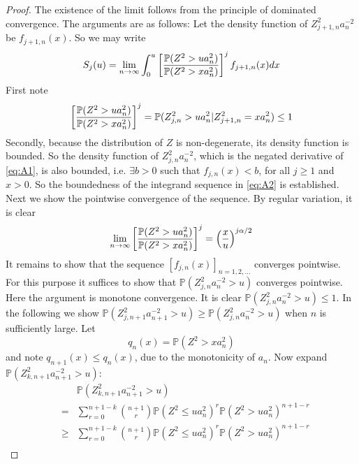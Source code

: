 \documentclass[11pt,reqno]{amsart}
\renewcommand{\P}{\mathbb{P}}
\newcommand{\1}{\mathds{1}}
\newcommand{\0}{\boldsymbol{0}}
\newcommand{\4}{\mathchoice{\mskip1.5mu}{\mskip1.5mu}{}{}}
\newcommand{\5}{\mathchoice{\mskip-1.5mu}{\mskip-1.5mu}{}{}}
\newcommand{\2}{\penalty250\mskip\thickmuskip\mskip-\thinmuskip} %
\begin{document}
\begin{proof}
The existence of the limit follows from the principle of dominated
convergence. The arguments are as follows: Let the density function of
$Z_{j+1, n}^2 a_n^{-2}$ be $f_{j+1,n}(x)$. So we may write
\begin{equation}
  \label{eq:A2}
  S_j(u) = \lim_{n \to \infty}\int_{0}^u \left[
    {\P(Z^2 > ua_n^2) \over \P(Z^2 > xa_n^2)}
  \right]^j f_{j+1,n}(x)dx
\end{equation}
First note
\[
\left[
    {\P(Z^2 > ua_n^2) \over \P(Z^2 > xa_n^2)}
  \right]^j = \P(Z_{j,n}^2 > ua_n^2 | Z_{j+1, n}^2 = xa_n^2) \leq 1
\]
Secondly, because the distribution of $Z$ is non-degenerate, its
density function is bounded. So the density function of
$Z_{j,n}^2a_n^{-2}$, which is the negated derivative of
\eqref{eq:A1}, is also bounded, i.e. $\exists b > 0$ such that
$f_{j, n}(x) < b$, for all $j \geq 1$ and $x > 0$. So the
boundedness of the integrand sequence in \eqref{eq:A2} is
established. Next we show the pointwise convergence of the
sequence. By regular variation, it is clear
\[
\lim_{n \to \infty} \left[
    {\P(Z^2 > ua_n^2) \over \P(Z^2 > xa_n^2)}
  \right]^j = \left(
    x \over u
    \right)^{j\alpha/2}
\]
It remains to show that the sequence $[f_{j,n}(x)]_{n=1,2,\dots}$
converges pointwise. For this purpose it suffices to show that
$\P(Z_{j, n}^2 a_n^{-2} > u)$ converges pointwise. Here the argument
is monotone convergence. It is clear $\P(Z_{j, n}^2 a_n^{-2} > u) \leq
1$. In the following we show $\P(Z_{j, n+1}^2 a_{n+1}^{-2} > u) \geq
\P(Z_{j, n}^2 a_n^{-2} > u)$ when $n$ is sufficiently large. Let
\[
q_n(x) = \P(Z^2 > x a_n^2)
\]
and note $q_{n+1}(x) \leq q_n(x)$, due to the monotonicity of
$a_n$. Now expand $\P(Z_{k, n+1}^2 a_{n+1}^{-2} > u)$:
\begin{eqnarray*}
  && \P(Z_{k, n+1}^2 a_{n+1}^{-2} > u)\\
  &=& \sum_{r=0}^{n+1-k} {n+1 \choose r} \P(Z^2 \leq ua_n^2)^r \P(Z^2 >
  u a_n^2)^{n+1-r} \\
  &\geq& \sum_{r=0}^{n+1-k} {n+1 \choose r} \P(Z^2 \leq ua_n^2)^r \P(Z^2 >
  u a_n^2)^{n+1-r} \\
\end{eqnarray*}

\end{proof}
\end{document}
